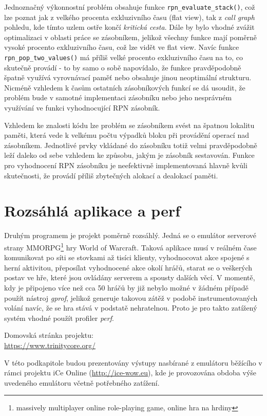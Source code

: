 \documentclass[czech,BP]{thesiskiv}
\begin{document}
Jednoznačný výkonnostní problém obsahuje funkce \texttt{rpn\_evaluate\_stack()}, což lze poznat jak z velkého procenta exkluzivního času (flat view), tak z \emph{call graph} pohledu, kde tímto uzlem ostře končí \emph{kritická cesta}. Dále by bylo vhodné zvážit optimalizaci v oblasti práce se zásobníkem, jelikož všechny funkce mají poměrně vysoké procento exkluzivního času, což lze vidět ve flat view. Navíc funkce \texttt{rpn\_pop\_two\_values()} má příliš velké procento exkluzivního času na to, co skutečně provádí - to by samo o sobě napovídalo, že funkce pravděpodobně špatně využívá vyrovnávací paměť nebo obsahuje jinou neoptimální strukturu. Nicméně vzhledem k časům ostatních zásobníkových funkcí se dá usoudit, že problém bude v samotné implementaci zásobníku nebo jeho nesprávném využívání ve funkci vyhodnocující RPN zásobník.

Vzhledem ke znalosti kódu lze problém se zásobníkem svést na špatnou lokalitu paměti, která vede k velkému počtu výpadků bloku při provádění operací nad zásobníkem. Jednotlivé prvky vkládané do zásobníku totiž velmi pravděpodobně leží daleko od sebe vzhledem ke způsobu, jakým je zásobník sestavován. Funkce pro vyhodnocení RPN zásobníku je neefektivně implementovaná hlavně kvůli skutečnosti, že provádí příliš zbytečných alokací a dealokací paměti.


\section{Rozsáhlá aplikace a perf}

Druhým programem je projekt poměrně rozsáhlý. Jedná se o emulátor serverové strany MMORPG\footnote{massively multiplayer online role-playing game, online hra na hrdiny} hry World of Warcraft. Taková aplikace musí v reálném čase komunikovat po síti se stovkami až tisíci klienty, vyhodnocovat akce spojené s herní aktivitou, přeposílat vyhodnocené akce okolí hráčů, starat se o  veškerých postav ve hře, které jsou ovládány serverem a spousty dalších věcí. V momentě, kdy je připojeno více než cca 50 hráčů by již nebylo možné v žádném případě použít nástroj \emph{gprof}, jelikož generuje takovou zátěž v podobě instrumentovaných volání navíc, že se hra stává v podstatě nehratelnou. Proto je pro takto zatížený systém vhodné použít profiler \emph{perf}.

Domovská stránka projektu:\\
\url{https://www.trinitycore.org/}

V této podkapitole budou prezentovány výstupy nasbírané z emulátoru běžícího v rámci projektu iCe Online (\url{http://ice-wow.eu}), kde je provozována obdoba výše uvedeného emulátoru včetně potřebného zatížení.
\end{document}

